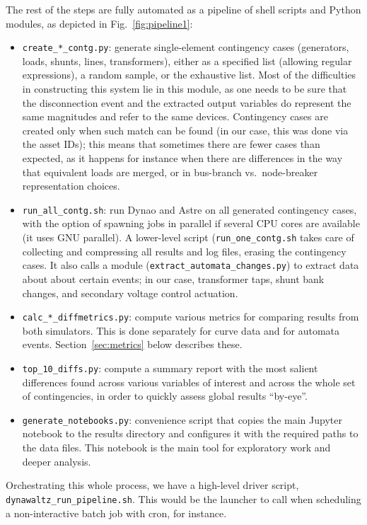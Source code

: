 \documentclass[conference]{IEEEtran}
\newcommand{\Dynawo}{Dyna\textomega o\xspace} %
\newcommand{\code}[1]{\texttt{#1}}
\begin{document}
The rest of the steps are fully automated as a pipeline of shell scripts and
Python modules, as depicted in Fig.~\ref{fig:pipeline1}:
\begin{itemize}
\item \code{create\_*\_contg.py}: generate single-element contingency cases
  (generators, loads, shunts, lines, transformers), either as a specified list
  (allowing regular expressions), a random sample, or the exhaustive list.  Most
  of the difficulties in constructing this system lie in this module, as one
  needs to be sure that the disconnection event and the extracted output
  variables do represent the same magnitudes and refer to the same
  devices. Contingency cases are created only when such match can be found (in
  our case, this was done via the asset IDs); this means that sometimes there
  are fewer cases than expected, as it happens for instance when there are
  differences in the way that equivalent loads are merged, or in bus-branch
  vs.\ node-breaker representation choices.
\item \code{run\_all\_contg.sh}: run \Dynawo and Astre on all generated
  contingency cases, with the option of spawning jobs in parallel if several
  CPU cores are available (it uses GNU parallel).  A lower-level script
  (\code{run\_one\_contg.sh} takes care of collecting and compressing all
  results and log files, erasing the contingency cases. It also calls a module
  (\code{extract\_automata\_changes.py}) to extract data about about certain
  events; in our case, transformer taps, shunt bank changes, and secondary
  voltage control actuation.
\item \code{calc\_*\_diffmetrics.py}: compute various metrics for
  comparing results from both simulators. This is done separately for
  curve data and for automata events. Section~\ref{sec:metrics} below
  describes these.
\item \code{top\_10\_diffs.py}: compute a summary report with the most salient
  differences found across various variables of interest and across the whole
  set of contingencies, in order to quickly assess global results ``by-eye''.
\item \code{generate\_notebooks.py}: convenience script that copies the main
  Jupyter notebook to the results directory and configures it with the required
  paths to the data files. This notebook is the main tool for exploratory work
  and deeper analysis.
\end{itemize}
Orchestrating this whole process, we have a high-level driver script,
\code{dynawaltz\_run\_pipeline.sh}. This would be the launcher to call when
scheduling a non-interactive batch job with cron, for instance.
\end{document}
